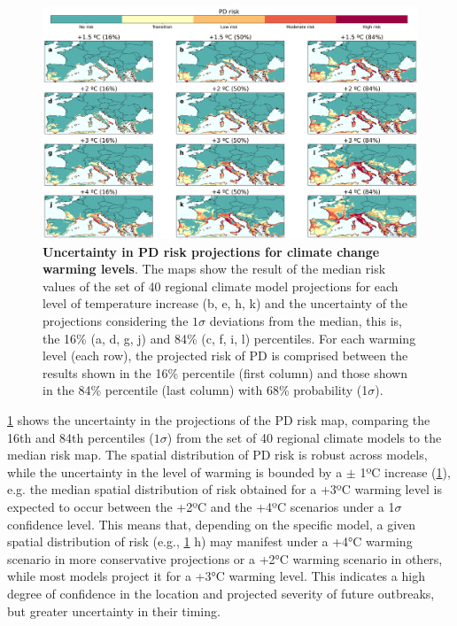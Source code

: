 \begin{figure}[t!]
    \centering
    \includegraphics[width=\textwidth]{Figures/Uncertainty.png}
    \caption[Uncertainty in PD risk projections for climate change
        warming levels]{\textbf{Uncertainty in PD risk projections for climate
            change
            warming levels}. The maps show the result of the median risk values
        of the set
        of 40 regional climate model projections for each level of temperature
        increase
        (b, e, h, k) and the uncertainty of the projections considering the $1
            \sigma$
        deviations from the median, this is, the 16\% (a, d, g, j) and 84\% (c,
        f, i,
        l) percentiles. For each warming level (each row), the projected risk
        of PD is
        comprised between the results shown in the 16\% percentile (first
        column) and
        those shown in the 84\% percentile (last column) with 68\% probability
        (1$\sigma$).}
    \label{fig:uncertainty}
\end{figure}

\cref{fig:uncertainty} shows the uncertainty in the projections of the PD
risk map, comparing the 16th and 84th percentiles ($1\sigma$) from the set of
40 regional climate models to the median risk map. The spatial distribution of
PD risk is robust across models, while the uncertainty in the level of warming
is bounded by a $\pm$ 1ºC increase (\cref{fig:uncertainty}), e.g. the median
spatial distribution of risk obtained for a +3ºC warming level is expected to
occur between the +2ºC and the +4ºC scenarios under a 1$\sigma$ confidence
level. This means that, depending on the specific model, a given spatial
distribution of risk (e.g., \cref{fig:uncertainty} h) may manifest under a +4°C
warming scenario in more conservative projections or a +2°C warming scenario in
others, while most models project it for a +3°C warming level. This indicates a
high degree of confidence in the location and projected severity of future
outbreaks, but greater uncertainty in their timing.

